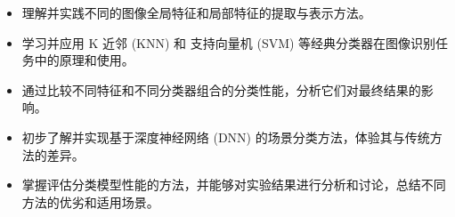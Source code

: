 \begin{itemize}
    \item 理解并实践不同的图像全局特征和局部特征的提取与表示方法。
    \item 学习并应用 K 近邻 (KNN) 和 支持向量机 (SVM) 等经典分类器在图像识别任务中的原理和使用。
    \item 通过比较不同特征和不同分类器组合的分类性能，分析它们对最终结果的影响。
    \item 初步了解并实现基于深度神经网络 (DNN) 的场景分类方法，体验其与传统方法的差异。
    \item 掌握评估分类模型性能的方法，并能够对实验结果进行分析和讨论，总结不同方法的优劣和适用场景。
\end{itemize}
